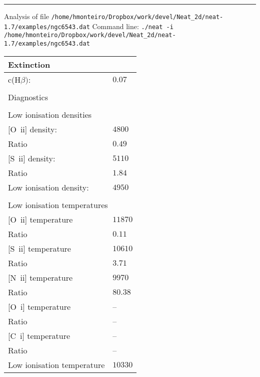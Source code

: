  \hrule
 \vspace{0.3cm}
 \noindent Analysis of file {\tt /home/hmonteiro/Dropbox/work/devel/Neat_2d/neat-1.7/examples/ngc6543.dat}\newline
 \noindent Command line: {\tt ./neat -i /home/hmonteiro/Dropbox/work/devel/Neat_2d/neat-1.7/examples/ngc6543.dat}\newline
 \begin{longtable}[l]{ll}
 \multicolumn{2}{l}{Extinction}\\ \hline
 c(H$\beta)$:                        & $  0.07$\\
 \vspace{0.2cm}\\\multicolumn{2}{l}{Diagnostics}\\ \hline
 \vspace{0.2cm}\\\multicolumn{2}{l}{Low ionisation densities}\\ \hline
 {}[O~{\sc ii}] density:             & $ 4800$\\
 Ratio                               & $  0.49$\\
 {}[S~{\sc ii}] density:             & $ 5110$\\
 Ratio                               & $  1.84$\\
 Low ionisation density:             & $ 4950$\\
 \vspace{0.2cm}\\\multicolumn{2}{l}{Low ionisation temperatures}\\ \hline
 {}[O~{\sc ii}] temperature          & $11870$\\
 Ratio                               & $  0.11$\\
 {}[S~{\sc ii}] temperature          & $10610$\\
 Ratio                               & $  3.71$\\
 {}[N~{\sc ii}] temperature          & $ 9970$\\
 Ratio                               & $ 80.38$\\
 {}[O~{\sc i}] temperature           & -- \\
 Ratio                               & -- \\
 {}[C~{\sc i}] temperature           & -- \\
 Ratio                               & -- \\
 Low ionisation temperature          & $10330$\\

\end{longtable}
